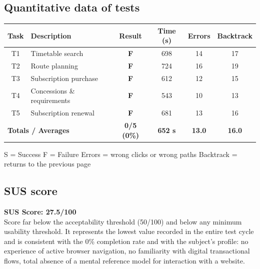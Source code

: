 ﻿\documentclass[11pt,a4paper]{article}
\begin{document}
\subsection*{Quantitative data of tests}
\begin{tcolorbox}[base]
\begin{center}
\renewcommand{\arraystretch}{1.4}
\begin{tabular}{clcccc}
\toprule
\textbf{Task} & \textbf{Description} &
\textbf{Result} & \textbf{Time (s)} &
\textbf{Errors} & \textbf{Backtrack} \\
\midrule
T1 & Timetable search          & \textbf{F} & 698 & 14 & 17 \\
T2 & Route planning            & \textbf{F} & 724 & 16 & 19 \\
T3 & Subscription purchase     & \textbf{F} & 612 & 12 & 15 \\
T4 & Concessions \& requirements & \textbf{F} & 543 & 10 & 13 \\
T5 & Subscription renewal      & \textbf{F} & 681 & 13 & 16 \\
\midrule
\multicolumn{2}{l}{\textbf{Totals / Averages}} &
\textbf{0/5 (0\%)} & \textbf{652 s} &
\textbf{13.0} & \textbf{16.0} \\
\bottomrule
\end{tabular}
\end{center}
\vspace{0.3cm}
\small S = Success \quad F = Failure \quad
Errors = wrong clicks or wrong paths \quad
Backtrack = returns to the previous page
\end{tcolorbox}

\subsection*{SUS score}
\begin{tcolorbox}[base]
\textbf{SUS Score: 27.5/100}\\[0.2cm]
\small Score far below the acceptability
threshold (50/100) and below any minimum usability
threshold. It represents the lowest value
recorded in the entire test cycle and is consistent with the
0\% completion rate and with the subject's
profile: no experience of active browser navigation,
no familiarity with digital transactional
flows, total absence of a mental reference
model for interaction with a website.
\end{tcolorbox}
\end{document}
